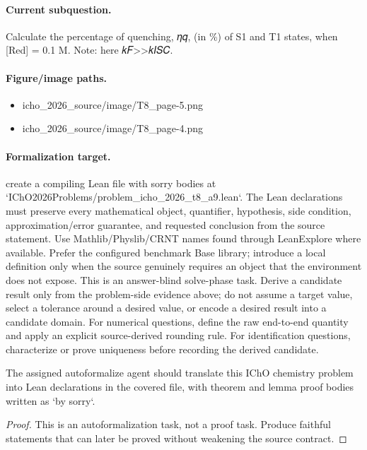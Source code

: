 \paragraph{Current subquestion.}
Calculate the percentage of quenching, 𝜂𝑞, (in \%) of S1 and T1 states, when [Red] = 0.1 M. Note: here 𝑘𝐹>>𝑘𝐼𝑆𝐶.

\paragraph{Figure/image paths.}
\begin{itemize}
\item icho\_2026\_source/image/T8\_page-5.png
\item icho\_2026\_source/image/T8\_page-4.png
\end{itemize}

\paragraph{Formalization target.}
create a compiling Lean file with sorry bodies at `IChO2026Problems/problem\_icho\_2026\_t8\_a9.lean`.
The Lean declarations must preserve every mathematical object, quantifier, hypothesis, side condition, approximation/error guarantee, and requested conclusion from the source statement.
Use Mathlib/Physlib/CRNT names found through LeanExplore where available. Prefer the configured benchmark Base library; introduce a local definition only when the source genuinely requires an object that the environment does not expose.
This is an answer-blind solve-phase task. Derive a candidate result only from the problem-side evidence above; do not assume a target value, select a tolerance around a desired value, or encode a desired result into a candidate domain.
For numerical questions, define the raw end-to-end quantity and apply an explicit source-derived rounding rule. For identification questions, characterize or prove uniqueness before recording the derived candidate.

\begin{theorem}
\label{thm:physics:icho_2026_t8_a9:target}
The assigned autoformalize agent should translate this IChO chemistry problem into Lean declarations in the covered file, with theorem and lemma proof bodies written as `by sorry`.
\end{theorem}
\begin{proof}
This is an autoformalization task, not a proof task. Produce faithful statements that can later be proved without weakening the source contract.
\end{proof}
